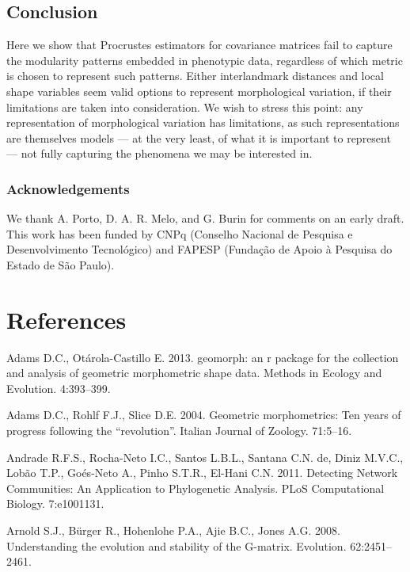 \documentclass[12pt,]{article}
\begin{document}
\subsection{Conclusion}\label{conclusion}

Here we show that Procrustes estimators for covariance matrices fail to
capture the modularity patterns embedded in phenotypic data, regardless
of which metric is chosen to represent such patterns. Either
interlandmark distances and local shape variables seem valid options to
represent morphological variation, if their limitations are taken into
consideration. We wish to stress this point: any representation of
morphological variation has limitations, as such representations are
themselves models --- at the very least, of what it is important to
represent --- not fully capturing the phenomena we may be interested in.

\subsubsection{Acknowledgements}\label{acknowledgements}

We thank A. Porto, D. A. R. Melo, and G. Burin for comments on an early
draft. This work has been funded by CNPq (Conselho Nacional de Pesquisa
e Desenvolvimento Tecnológico) and FAPESP (Fundação de Apoio à Pesquisa
do Estado de São Paulo).

\section*{References}\label{references}

Adams D.C., Otárola-Castillo E. 2013. geomorph: an r package for the
collection and analysis of geometric morphometric shape data. Methods in
Ecology and Evolution. 4:393--399.

Adams D.C., Rohlf F.J., Slice D.E. 2004. Geometric morphometrics: Ten
years of progress following the ``revolution''. Italian Journal of
Zoology. 71:5--16.

Andrade R.F.S., Rocha-Neto I.C., Santos L.B.L., Santana C.N. de, Diniz
M.V.C., Lobão T.P., Goés-Neto A., Pinho S.T.R., El-Hani C.N. 2011.
Detecting Network Communities: An Application to Phylogenetic Analysis.
PLoS Computational Biology. 7:e1001131.

Arnold S.J., Bürger R., Hohenlohe P.A., Ajie B.C., Jones A.G. 2008.
Understanding the evolution and stability of the G-matrix. Evolution.
62:2451--2461.
\end{document}
